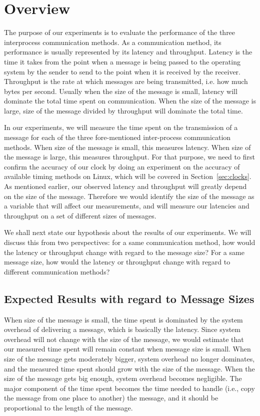 \documentclass[11pt,conference]{IEEEtran}
\begin{document}
\section{Overview}
\label{sec:overview}
The purpose of our experiments is to evaluate the performance of the three interprocess communication methods.
As a communication method, its performance is usually represented by its latency and throughput.
Latency is the time it takes from the point when a message is being passed to the operating system by the sender to send to the point when it is received by the receiver.
Throughput is the rate at which messages are being transmitted, i.e. how much bytes per second.
Usually when the size of the message is small, latency will dominate the total time spent on communication.
When the size of the message is large, size of the message divided by throughput will dominate the total time.

In our experiments, we will measure the time spent on the transmission of a message for each of the three fore-mentioned inter-process communication methods.
When size of the message is small, this measures latency.
When size of the message is large, this measures throughput.
For that purpose, we need to first confirm the accuracy of our clock by doing an experiment on the accuracy of available timing methods on Linux, which will be covered in Section~\ref{sec:clocks}.
As mentioned earlier, our observed latency and throughput will greatly depend on the size of the message.
Therefore we would identify the size of the message as a variable that will affect our measurements, and will measure our latencies and throughput on a set of different sizes of messages.

We shall next state our hypothesis about the results of our experiments.
We will discuss this from two perspectives: for a same communication method, how would the latency or throughput change with regard to the message size?
For a same message size, how would the latency or throughput change with regard to different communication methods?

\subsection{Expected Results with regard to Message Sizes}
When size of the message is small, the time spent is dominated by the system overhead of delivering a message, which is basically the latency.
Since system overhead will not change with the size of the message, we would estimate that our measured time spent will remain constant when message size is small.
When size of the message gets moderately bigger, system overhead no longer dominates, and the measured time spent should grow with the size of the message.
When the size of the message gets big enough, system overhead becomes negligible.
The major component of the time spent becomes the time needed to handle (i.e., copy the message from one place to another) the message, and it should be proportional to the length of the message.
\end{document}
